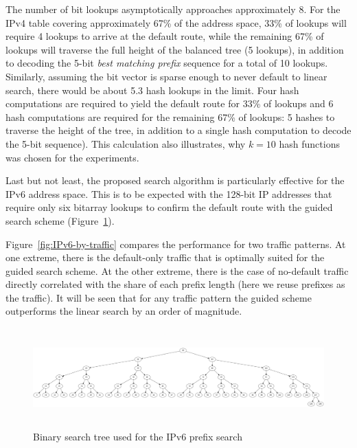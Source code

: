 \documentclass[conference,compsoc]{IEEEtran}
\begin{document}
The number of bit lookups asymptotically approaches approximately 8. 
For the IPv4 table covering
approximately 67\% of the address space, 33\% of lookups will
require 4 lookups to arrive at the default route, while the remaining
67\% of lookups will
traverse the full height of the balanced tree (5 lookups), in addition to
decoding the 5-bit \emph{best matching prefix} sequence for a total of
10 lookups. Similarly, assuming the bit vector is sparse enough to never
default to linear search, there would be about 5.3 hash lookups in the limit.
Four hash computations are required to yield the default route for
33\% of lookups and 6 hash computations are required
for the remaining 67\% of lookups: 5 hashes to traverse the height of the 
tree, in addition to a single hash computation to decode the 5-bit sequence).
This calculation also illustrates, why $k=10$ hash functions was chosen
for the experiments.

Last but not least, the proposed search algorithm is particularly effective
for the IPv6 address space. This is to be expected with the 128-bit IP
addresses that require only six bitarray lookups to confirm the default
route with the guided search scheme (Figure~\ref{fig:IPv6-tree}).

Figure~\ref{fig:IPv6-by-traffic} compares the performance for two traffic 
patterns. At one extreme, there is the default-only
traffic that is optimally suited for the guided search scheme. At the other
extreme, there is the case of no-default traffic directly correlated with 
the share of each prefix
length (here we reuse prefixes as the traffic). It will be seen that for any
traffic pattern the guided scheme outperforms the linear search
by an order of magnitude.





\clearpage
\begin{figure}[p]
\centering
\includegraphics[height=1.5in]{../img/ipv6_balanced_tree.png}
  \caption{Binary search tree used for the IPv6 prefix search}
\label{fig:IPv6-tree}
\end{figure}
\end{document}
